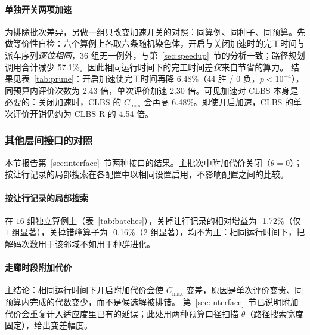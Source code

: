 \documentclass[manuscript,screen,review]{acmart}
\newcommand{\SpeedupProbe}{2.30}
\newcommand{\RouteCallCut}{57.1\%}
\newcommand{\GainPrune}{6.48\%}
\newcommand{\PPrune}{<10^{-4}}
\newcommand{\WinPrune}{44}
\newcommand{\LosePrune}{0}
\newcommand{\EvalRatioPrune}{2.43}
\newcommand{\CostMultAfter}{4.54}
\newcommand{\MatrixCells}{16}
\newcommand{\GainCertMatrix}{-1.72\%}    %
\newcommand{\GainStaggerMatrix}{-0.16\%} %
\begin{document}
\paragraph{单独开关两项加速}
为排除批次差异，另做一组只改变加速开关的对照：同算例、同种子、同预算。先做等价性自检：六个算例上各取六条随机染色体，开启与关闭加速时的完工时间与派车序列\emph{逐位相同}，$36$ 组无一例外，与第~\ref{sec:speedup}~节的分析一致；路径规划调用合计减少 \RouteCallCut{}。因此相同运行时间下的完工时间差\emph{仅}来自节省的算力。
结果见表~\ref{tab:prune}：开启加速使完工时间再降 \GainPrune{}（\WinPrune{} 胜 / \LosePrune{} 负，$p\PPrune$），同预算内评价次数为 \EvalRatioPrune{} 倍，单次评价加速 \SpeedupProbe{} 倍。可见加速对 CLBS 本身是必要的：关闭加速时，CLBS 的 $C_{\max}$ 会再高 \GainPrune{}。即使开启加速，CLBS 的单次评价开销仍约为 CLBS-R 的 \CostMultAfter{} 倍。

\begin{table}[t]
\caption{CLBS 下两项加速（下界剪枝与胜者路径复用）的开关对照。
「关」/「开」表示两项加速是否启用，加粗列为本文采用的设置；两种设置选出的 AGV 与完工时间逐位相同，差值仅来自算力节省。
同算例、同种子、相同运行时间；$n=60$ 配对，双侧 Wilcoxon 符号秩检验（$^{***}p<0.001$）。
「评价次数比」为开$\div$关（$>1$ 表示开启后同预算内评价更多）；「单次评价加速比」为关$\div$开（$>1$ 表示开启后单次评价更快）。}
\label{tab:prune}
\small

\end{table}

\subsubsection{其他层间接口的对照}
\label{sec:pricing}

本节报告第~\ref{sec:interface}~节两种接口的结果。主批次中附加代价关闭（$\theta=0$）；按让行记录的局部搜索在各配置中以相同设置启用，不影响配置之间的比较。

\paragraph{按让行记录的局部搜索}
在 $\MatrixCells$ 组独立算例上（表~\ref{tab:batches}），关掉让行记录的相对增益为 \GainCertMatrix{}（仅 $1$ 组显著），关掉错峰算子为 \GainStaggerMatrix{}（$2$ 组显著），均不为正：相同运行时间下，把解码次数用于该邻域不如用于种群进化。

\paragraph{走廊时段附加代价}
主结论：相同运行时间下开启附加代价会使 $C_{\max}$ 变差，原因是单次评价变贵、同预算内完成的代数变少，而不是候选解被排错。
第~\ref{sec:interface}~节已说明附加代价会重复计入适应度里已有的延误；此处用两种预算口径扫描 $\theta$（路径搜索宽度固定），给出变差幅度。
\end{document}
